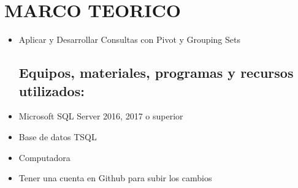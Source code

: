 \section{MARCO TEORICO} 

\begin{itemize}
\subsection{Objetivos:}
	\item Aplicar y Desarrollar  Consultas con Pivot y Grouping Sets
\subsection{Equipos, materiales, programas y recursos utilizados:}
	\item Microsoft SQL Server 2016, 2017 o superior
	\item Base de datos TSQL
	\item Computadora
	\item Tener una cuenta en Github para subir los cambios


\end{itemize}